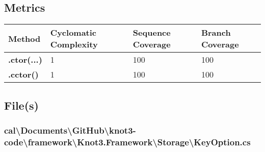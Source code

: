 \documentclass[a4paper,10pt]{article}
\begin{document}
\subsection{Metrics}
\begin{longtable}[l]{|l|l|l|l|}
\hline
\textbf{Method} & \textbf{Cyclomatic Complexity} & \textbf{Sequence Coverage} & \textbf{Branch Coverage}\\
\hline
\textbf{.ctor(...)} & 1 & 100 & 100\\
\hline
\textbf{.cctor()} & 1 & 100 & 100\\
\hline
\end{longtable}
\subsection{File(s)}
\subsubsection{cal\textbackslash Documents\textbackslash GitHub\textbackslash knot3-code\textbackslash framework\textbackslash Knot3.Framework\textbackslash Storage\textbackslash KeyOption.cs}
\end{document}
